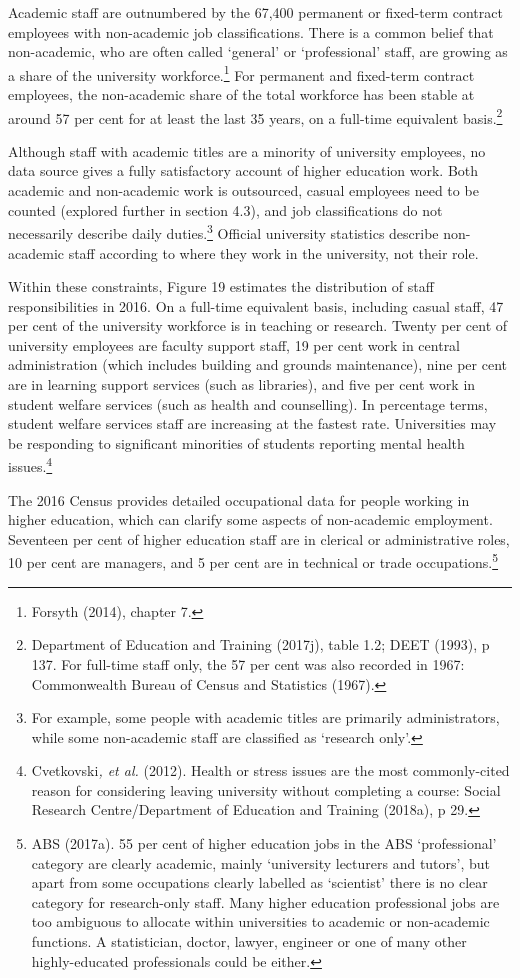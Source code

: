 \documentclass[]{book}
\begin{document}
Academic staff are outnumbered by the 67,400 permanent or fixed-term contract employees with non-academic job classifications. There is a common belief that non-academic, who are often called `general' or `professional' staff, are growing as a share of the university workforce.\footnote{Forsyth (2014), chapter 7.} For permanent and fixed-term contract employees, the non-academic share of the total workforce has been stable at around 57 per cent for at least the last 35 years, on a full-time equivalent basis.\footnote{Department of Education and Training (2017j), table 1.2; DEET (1993), p 137. For full-time staff only, the 57 per cent was also recorded in 1967: Commonwealth Bureau of Census and Statistics (1967).}

Although staff with academic titles are a minority of university employees, no data source gives a fully satisfactory account of higher education work. Both academic and non-academic work is outsourced, casual employees need to be counted (explored further in section 4.3), and job classifications do not necessarily describe daily duties.\footnote{For example, some people with academic titles are primarily administrators, while some non-academic staff are classified as `research only'.} Official university statistics describe non-academic staff according to where they work in the university, not their role.

Within these constraints, Figure 19 estimates the distribution of staff responsibilities in 2016. On a full-time equivalent basis, including casual staff, 47 per cent of the university workforce is in teaching or research. Twenty per cent of university employees are faculty support staff, 19 per cent work in central administration (which includes building and grounds maintenance), nine per cent are in learning support services (such as libraries), and five per cent work in student welfare services (such as health and counselling). In percentage terms, student welfare services staff are increasing at the fastest rate. Universities may be responding to significant minorities of students reporting mental health issues.\footnote{Cvetkovski\emph{, et al.} (2012). Health or stress issues are the most commonly-cited reason for considering leaving university without completing a course: Social Research Centre/Department of Education and Training (2018a), p 29.}

The 2016 Census provides detailed occupational data for people working in higher education, which can clarify some aspects of non-academic employment. Seventeen per cent of higher education staff are in clerical or administrative roles, 10 per cent are managers, and 5 per cent are in technical or trade occupations.\footnote{ABS (2017a). 55 per cent of higher education jobs in the ABS `professional' category are clearly academic, mainly `university lecturers and tutors', but apart from some occupations clearly labelled as `scientist' there is no clear category for research-only staff. Many higher education professional jobs are too ambiguous to allocate within universities to academic or non-academic functions. A statistician, doctor, lawyer, engineer or one of many other highly-educated professionals could be either.}
\end{document}
